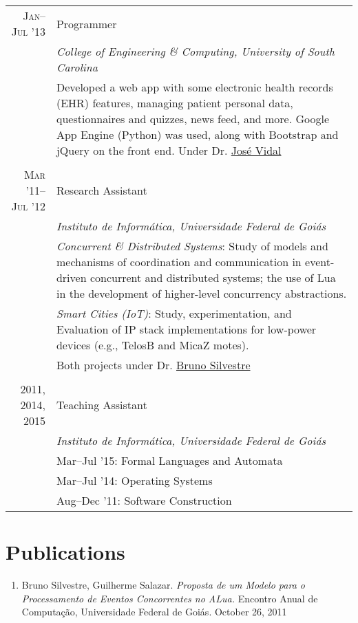 \documentclass[a4paper,10pt]{article}
\begin{document}
\begin{longtable}{r|p{11cm}}
  \textsc{Jan--Jul '13}
  & Programmer \\
  &\emph{College of Engineering \& Computing, University of South Carolina}\\
  &\footnotesize{Developed a web app with some electronic health records (EHR)
  features, managing patient personal data, questionnaires and quizzes, news feed, 
  and more. Google App Engine (Python) was used, along with Bootstrap and jQuery
  on the front end. Under Dr. \href{http://jmvidal.cse.sc.edu}{José Vidal}}\\
  \multicolumn{2}{c}{} \\

  \textsc{Mar '11--Jul '12}
  & Research Assistant \\
  &\emph{Instituto de Informática, Universidade Federal de Goiás}\\
  &\footnotesize{\emph{Concurrent \& Distributed Systems}: Study of models and
  mechanisms of coordination and communication in event-driven concurrent and 
  distributed systems; the use of Lua in the development of higher-level
  concurrency abstractions.}\\
  &\footnotesize{\emph{Smart Cities (IoT)}: Study, experimentation, and Evaluation 
  of IP stack implementations for low-power devices (e.g., TelosB and MicaZ motes).}\\
  &\footnotesize{Both projects under 
    Dr. \href{http://inf.ufg.br/~brunoos/}{Bruno Silvestre}}\\
  \multicolumn{2}{c}{} \\

  \textsc{2011, 2014, 2015}
  & Teaching Assistant \\
  &\emph{Instituto de Informática, Universidade Federal de Goiás} \\
  &\footnotesize{Mar--Jul '15: Formal Languages and Automata} \\
  &\footnotesize{Mar--Jul '14: Operating Systems} \\
  &\footnotesize{Aug--Dec '11: Software Construction}
\end{longtable}

\section{Publications}
\begin{enumerate}
  \renewcommand{\labelenumi}{[\arabic{enumi}] }
  \item Bruno Silvestre, Guilherme Salazar. \emph{Proposta de um Modelo para o
        Processamento de Eventos Concorrentes no ALua.} Encontro Anual de
        Computação, Universidade Federal de Goiás. October 26, 2011
\end{enumerate}
\end{document}
